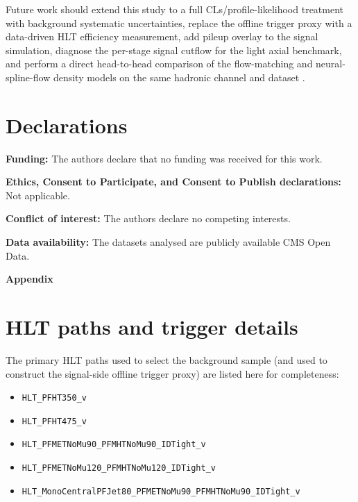 \documentclass[11pt,a4paper,twocolumn]{article}
\begin{document}
Future work should extend this study to a full CLs/profile-likelihood
treatment with background systematic uncertainties, replace the offline
trigger proxy with a data-driven HLT efficiency measurement, add pileup
overlay to the signal simulation, diagnose the per-stage signal cutflow for
the light axial benchmark, and perform a direct head-to-head comparison of
the flow-matching and neural-spline-flow density models on the same hadronic
channel and dataset \cite{rasineni_nsf_monoz}.

\section*{Declarations}

\noindent\textbf{Funding:} The authors declare that no funding was received for this work.

\noindent\textbf{Ethics, Consent to Participate, and Consent to Publish declarations:} Not applicable.

\noindent\textbf{Conflict of interest:} The authors declare no competing interests.

\noindent\textbf{Data availability:} The datasets analysed are publicly available CMS Open Data.

\clearpage
\onecolumn
\raggedbottom
\appendix
\begin{center}
\Large\textbf{Appendix}
\end{center}
\vspace{1em}

\section{HLT paths and trigger details}
\label{app:hlt}

The primary HLT paths used to select the background sample (and used to
construct the signal-side offline trigger proxy) are listed here for
completeness:

\begin{itemize}
  \item \texttt{HLT\_PFHT350\_v}
  \item \texttt{HLT\_PFHT475\_v}
  \item \texttt{HLT\_PFMETNoMu90\_PFMHTNoMu90\_IDTight\_v}
  \item \texttt{HLT\_PFMETNoMu120\_PFMHTNoMu120\_IDTight\_v}
  \item \texttt{HLT\_MonoCentralPFJet80\_PFMETNoMu90\_PFMHTNoMu90\_IDTight\_v}
\end{itemize}
\end{document}
